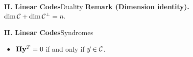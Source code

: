 \begin{frame}{\textbf{II. Linear Codes}}{Duality}
\small
{}
\textbf{Remark (Dimension identity).}\; $ \dim\mathcal{C}+\dim\mathcal{C}^\perp=n.$
\end{frame}


\begin{frame}{\textbf{II. Linear Codes}}{Syndromes}
\small
{}
\begin{itemize}
  \item $\mathbf{H}\mathbf{y}^T=0$ if and only if $\vec{y}\in\mathcal{C}$.
\end{itemize}
\end{frame}

